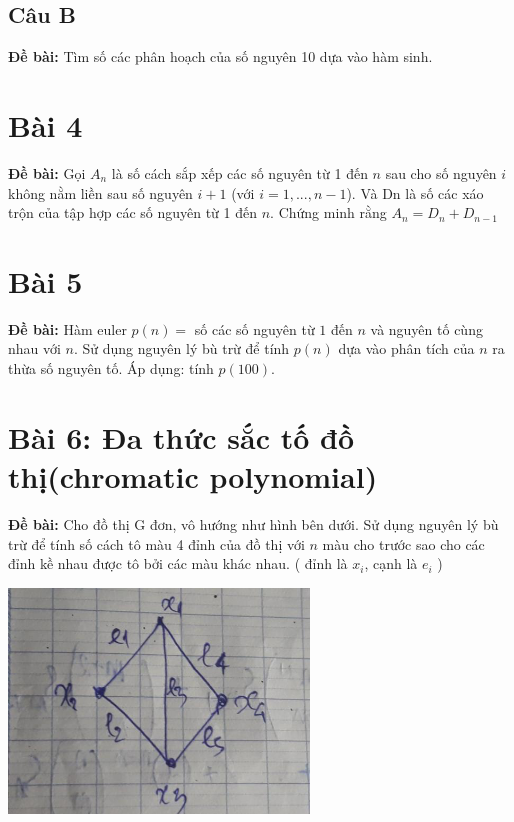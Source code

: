 \documentclass[12pt]{article}
\begin{document}
\begin{sloppypar}
\subsection{Câu B}
\begin{tcolorbox}
    \textbf{Đề bài:} Tìm số các phân hoạch của số nguyên 10 dựa vào hàm sinh.
\end{tcolorbox}

\section{Bài 4}
\begin{tcolorbox}
    \textbf{Đề bài:}  Gọi \(A_{n}\) là số cách sắp xếp các số nguyên từ 1 đến \(n\) sau cho số nguyên \(i\) không nằm liền sau số nguyên \(i+1\) 
    (với \(i=1,...,n-1\)). Và Dn là số các xáo trộn của tập hợp các số nguyên từ 1 đến \(n\). Chứng minh rằng \(A_{n}= D_{n} + D_{n-1}\)
\end{tcolorbox}

\section{Bài 5}
\begin{tcolorbox}
    \textbf{Đề bài:} Hàm euler \(p(n)=\) số các số nguyên từ \(1\) đến \(n\) và nguyên tố cùng nhau với \(n\). Sử dụng nguyên lý bù trừ để tính \(p(n)\) dựa vào phân tích của \(n\) ra thừa số nguyên tố. Áp dụng: tính \(p(100)\).
\end{tcolorbox}

\section{Bài 6: Đa thức sắc tố đồ thị(chromatic polynomial)}
\begin{tcolorbox}
    \textbf{Đề bài:} Cho đồ thị G đơn, vô hướng như hình bên dưới.  Sử dụng nguyên lý bù trừ để tính số cách tô màu 4 đỉnh của đồ thị với  \(n\) màu cho trước sao cho các đỉnh kề nhau được tô bởi các màu khác nhau. ( đỉnh là \(x_{i}\), cạnh là \(e_{i}\) )
\end{tcolorbox}

\begin{center}
    {\includegraphics[width=8cm]{6.png}}
\end{center}


\end{sloppypar}
\end{document}
